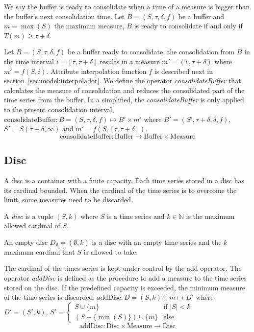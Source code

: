 We say the buffer is ready to consolidate when a time of a measure is
bigger than the buffer's next consolidation time.  Let
$B=(S,\tau,\delta,f)$ be a buffer and $m=\max(S)$ the maximum measure,
$B$ is ready to consolidate if and only if $T(m) \geq \tau+\delta$.



Let $B=(S,\tau,\delta,f)$ be a buffer ready to consolidate, the
consolidation from $B$ in the time interval $i=[\tau,\tau+\delta]$
results in a measure $m'=(v,\tau+\delta)$ where $m'=f(S,i)$. Attribute
interpolation function $f$ is described next in
section~\ref{sec:model:interpolador}.  We define the operator
\emph{consolidateBuffer} that calculates the measure of consolidation and
reduces the consolidated part of the time series from the buffer. In a
simplified, the \emph{consolidateBuffer} is only applied to the present
consolidation interval, $\text{consolidateBuffer}: B=(S,\tau,\delta,f)
\mapsto B' \times m' $ where $ B'= (S',\tau+\delta,\delta,f)$, $ S' =
S(\tau+\delta,\infty)$ and $m' = f(S,[\tau,\tau+\delta])$.
  \[
  \text{consolidateBuffer}: \text{Buffer} \longrightarrow \text{Buffer}
  \times \text{Measure}
  \]








\subsection{Disc}\label{sec:model:disc}

A disc is a container with a finite capacity. Each time series stored
in a disc has its cardinal bounded. When the cardinal of the time
series is to overcome the limit, some measures need to be discarded.

\begin{definition}[Disc]
  A \emph{disc} is a tuple $(S,k)$ where $S$ is a time
  series and $k\in\mathbb{N}$ is the maximum allowed cardinal of $S$.
\end{definition}

An empty disc $D_{\emptyset} = (\emptyset,k)$ is a disc with an empty
time series and the $k$ maximum cardinal that $S$ is allowed to take.

The cardinal of the times series is kept under control by the add
operator.  The operator \emph{addDisc} is defined as the procedure to
add a measure to the time series stored on the disc. If the predefined
capacity is exceeded, the minimum measure of the time series is
discarded, $\text{addDisc}: D=(S,k) \times m \mapsto D'$ where $ D' =
(S',k)$, $ S' =
  \begin{cases}
      S\cup\{m\} &\text{if }  |S|<k\\
      (S-\{\min(S)\}) \cup \{m\} & \text{else }
    \end{cases}  
    $
  \[
  \text{addDisc}: \text{Disc} \times \text{Measure} \longrightarrow \text{Disc}
  \]



